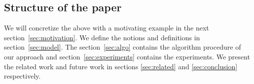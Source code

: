 \subsection{Structure of the paper}

We will concretize the above with a motivating example in the next section~\ref{sec:motivation}.  We define the notions and definitions in section~\ref{sec:model}. The section~\ref{sec:algo} contains the 
algorithm procedure of our approach and section~\ref{sec:experiments} contains the experiments. 
We present the related work and future work in sections \ref{sec:related} and \ref{sec:conclusion} respectively. 




